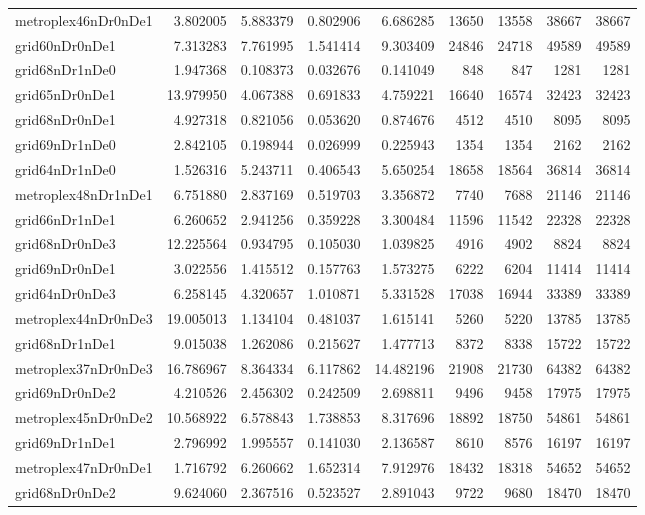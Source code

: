 \begin{longtable}{|l|r|r|r|r|r|r|r|r|}
metroplex46nDr0nDe1 & 3.802005 & 5.883379 & 0.802906 & 6.686285 & 13650 & 13558 & 38667 & 38667 \\
grid60nDr0nDe1 & 7.313283 & 7.761995 & 1.541414 & 9.303409 & 24846 & 24718 & 49589 & 49589 \\
grid68nDr1nDe0 & 1.947368 & 0.108373 & 0.032676 & 0.141049 & 848 & 847 & 1281 & 1281 \\
grid65nDr0nDe1 & 13.979950 & 4.067388 & 0.691833 & 4.759221 & 16640 & 16574 & 32423 & 32423 \\
grid68nDr0nDe1 & 4.927318 & 0.821056 & 0.053620 & 0.874676 & 4512 & 4510 & 8095 & 8095 \\
grid69nDr1nDe0 & 2.842105 & 0.198944 & 0.026999 & 0.225943 & 1354 & 1354 & 2162 & 2162 \\
grid64nDr1nDe0 & 1.526316 & 5.243711 & 0.406543 & 5.650254 & 18658 & 18564 & 36814 & 36814 \\
metroplex48nDr1nDe1 & 6.751880 & 2.837169 & 0.519703 & 3.356872 & 7740 & 7688 & 21146 & 21146 \\
grid66nDr1nDe1 & 6.260652 & 2.941256 & 0.359228 & 3.300484 & 11596 & 11542 & 22328 & 22328 \\
grid68nDr0nDe3 & 12.225564 & 0.934795 & 0.105030 & 1.039825 & 4916 & 4902 & 8824 & 8824 \\
grid69nDr0nDe1 & 3.022556 & 1.415512 & 0.157763 & 1.573275 & 6222 & 6204 & 11414 & 11414 \\
grid64nDr0nDe3 & 6.258145 & 4.320657 & 1.010871 & 5.331528 & 17038 & 16944 & 33389 & 33389 \\
metroplex44nDr0nDe3 & 19.005013 & 1.134104 & 0.481037 & 1.615141 & 5260 & 5220 & 13785 & 13785 \\
grid68nDr1nDe1 & 9.015038 & 1.262086 & 0.215627 & 1.477713 & 8372 & 8338 & 15722 & 15722 \\
metroplex37nDr0nDe3 & 16.786967 & 8.364334 & 6.117862 & 14.482196 & 21908 & 21730 & 64382 & 64382 \\
grid69nDr0nDe2 & 4.210526 & 2.456302 & 0.242509 & 2.698811 & 9496 & 9458 & 17975 & 17975 \\
metroplex45nDr0nDe2 & 10.568922 & 6.578843 & 1.738853 & 8.317696 & 18892 & 18750 & 54861 & 54861 \\
grid69nDr1nDe1 & 2.796992 & 1.995557 & 0.141030 & 2.136587 & 8610 & 8576 & 16197 & 16197 \\
metroplex47nDr0nDe1 & 1.716792 & 6.260662 & 1.652314 & 7.912976 & 18432 & 18318 & 54652 & 54652 \\
grid68nDr0nDe2 & 9.624060 & 2.367516 & 0.523527 & 2.891043 & 9722 & 9680 & 18470 & 18470 \\

\end{longtable}
